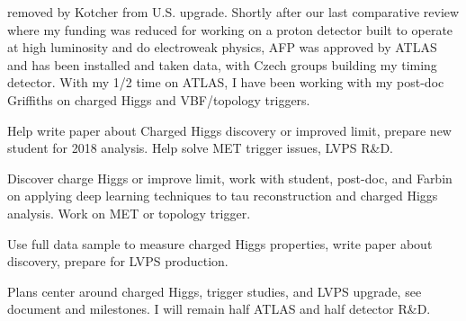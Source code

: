 removed by Kotcher from U.S. upgrade. Shortly after our last comparative review where my funding was reduced for working on a proton detector built to operate at high luminosity and do electroweak physics, AFP was approved by ATLAS and has been installed and taken data, with Czech groups building my timing detector.  With my 1/2 time on ATLAS, I have been working with my post-doc Griffiths on charged Higgs and VBF/topology triggers.

\vspace*{0.1in}
\begin{description}
\item[2017] Help write paper about Charged Higgs discovery or improved 
limit, prepare new student for 2018 analysis. Help solve MET trigger issues, LVPS R\&D.
\item[2018] Discover charge Higgs or improve limit,  work with student, post-doc, and Farbin on applying deep learning techniques to tau reconstruction and charged Higgs analysis. Work on MET or topology trigger.
\item[2019] Use full data sample to measure charged Higgs properties, write paper about discovery,  prepare for LVPS production. 
\end{description}
\vspace*{0.1in}
 Plans center around charged Higgs, trigger studies, and LVPS upgrade, see document and milestones.  I will remain half ATLAS and half detector R\&D. 
